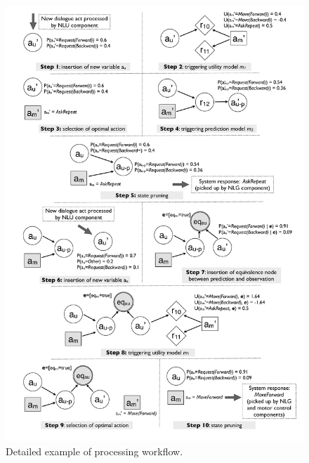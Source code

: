 \begin{figure}[p]
\centering
\includegraphics[scale=0.25]{imgs/detailedexample.pdf}
\caption{Detailed example of processing workflow. }
\label{fig:detailedexample}
\end{figure}
 

